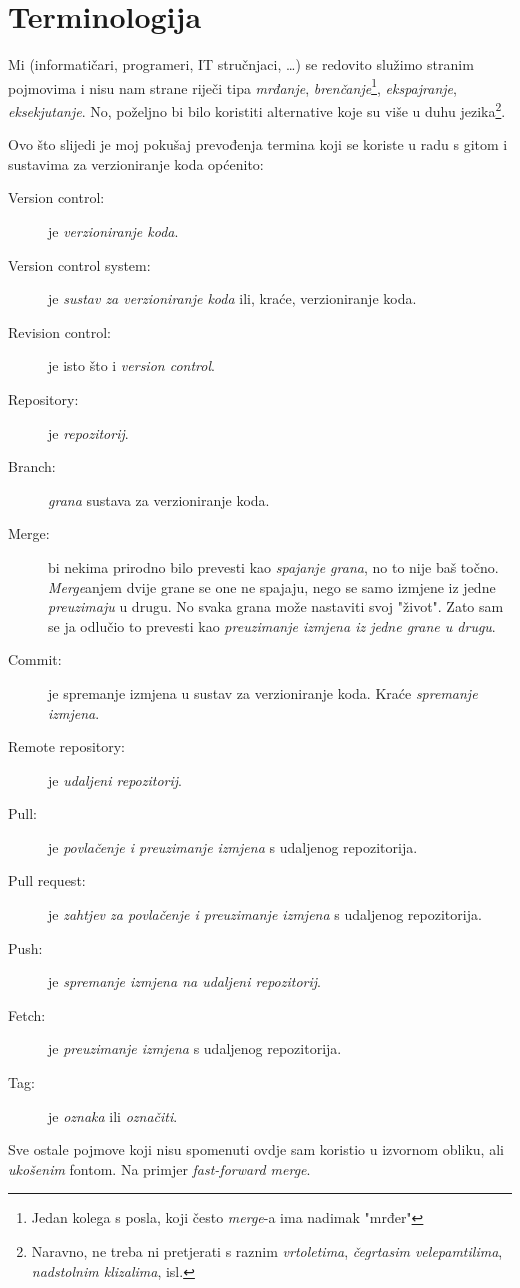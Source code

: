 \chapter*{Terminologija}

Mi (informatičari, programeri, IT stručnjaci, \dots) se redovito služimo stranim pojmovima i nisu nam strane riječi tipa \emph{mrđanje}, \emph{brenčanje}\footnote{Jedan kolega s posla, koji često \emph{merge}-a ima nadimak "mrđer"}, \emph{ekspajranje}, \emph{eksekjutanje}.
No, poželjno bi bilo koristiti alternative koje su više u duhu jezika\footnote{Naravno, ne treba ni pretjerati s raznim \emph{vrtoletima}, \emph{čegrtasim velepamtilima}, \emph{nadstolnim klizalima}, isl.}.

Ovo što slijedi je moj pokušaj prevođenja termina koji se koriste u radu s gitom i sustavima za verzioniranje koda općenito: 

\begin{description}
\item[Version control:] je \emph{verzioniranje koda}.
\item[Version control system:] je \emph{sustav za verzioniranje koda} ili, kraće, verzioniranje koda.
\item[Revision control:] je isto što i \emph{version control}.
\item[Repository:] je \emph{repozitorij}.
\item[Branch:] \emph{grana} sustava za verzioniranje koda.
\item[Merge:] bi nekima prirodno bilo prevesti kao \emph{spajanje grana}, no to nije baš točno. \emph{Merge}anjem dvije grane se one ne spajaju, nego se samo izmjene iz jedne \emph{preuzimaju} u drugu. No svaka grana može nastaviti svoj "život". Zato sam se ja odlučio to prevesti kao \emph{preuzimanje izmjena iz jedne grane u drugu}.
\item[Commit:] je spremanje izmjena u sustav za verzioniranje koda. Kraće \emph{spremanje izmjena}.
\item[Remote repository:] je \emph{udaljeni repozitorij}.
\item[Pull:] je \emph{povlačenje i preuzimanje izmjena} s udaljenog repozitorija.
\item[Pull request:] je \emph{zahtjev za povlačenje i preuzimanje izmjena} s udaljenog repozitorija.
\item[Push:] je \emph{spremanje izmjena na udaljeni repozitorij}.
\item[Fetch:] je \emph{preuzimanje izmjena} s udaljenog repozitorija.
\item[Tag:] je \emph{oznaka} ili \emph{označiti}.
\end{description}

Sve ostale pojmove koji nisu spomenuti ovdje sam koristio u izvornom obliku, ali \emph{ukošenim} fontom. Na primjer \emph{fast-forward merge}.


